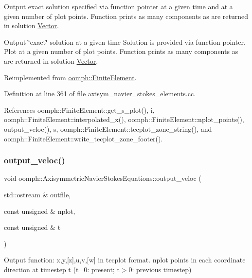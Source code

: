 Output exact solution specified via function pointer at a given time and at a given number of plot points. Function prints as many components as are returned in solution \hyperlink{classoomph_1_1Vector}{Vector}. 

Output \char`\"{}exact\char`\"{} solution at a given time Solution is provided via function pointer. Plot at a given number of plot points. Function prints as many components as are returned in solution \hyperlink{classoomph_1_1Vector}{Vector}. 

Reimplemented from \hyperlink{classoomph_1_1FiniteElement_a2a8426dccd57b927be0ae0eec00d0479}{oomph\+::\+Finite\+Element}.



Definition at line 361 of file axisym\+\_\+navier\+\_\+stokes\+\_\+elements.\+cc.



References oomph\+::\+Finite\+Element\+::get\+\_\+s\+\_\+plot(), i, oomph\+::\+Finite\+Element\+::interpolated\+\_\+x(), oomph\+::\+Finite\+Element\+::nplot\+\_\+points(), output\+\_\+veloc(), s, oomph\+::\+Finite\+Element\+::tecplot\+\_\+zone\+\_\+string(), and oomph\+::\+Finite\+Element\+::write\+\_\+tecplot\+\_\+zone\+\_\+footer().

\mbox{\label{classoomph_1_1AxisymmetricNavierStokesEquations_a3993d25e1ae47080505ec2570ba8c41f}} 
\subsubsection{\texorpdfstring{output\+\_\+veloc()}{output\_veloc()}}
{\footnotesize\ttfamily void oomph\+::\+Axisymmetric\+Navier\+Stokes\+Equations\+::output\+\_\+veloc (\begin{DoxyParamCaption}\item[{std\+::ostream \&}]{outfile,  }\item[{const unsigned \&}]{nplot,  }\item[{const unsigned \&}]{t }\end{DoxyParamCaption})}



Output function\+: x,y,\mbox{[}z\mbox{]},u,v,\mbox{[}w\mbox{]} in tecplot format. nplot points in each coordinate direction at timestep t (t=0\+: present; t$>$0\+: previous timestep) 

